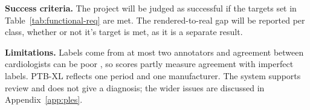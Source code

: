 \textbf{Success criteria.} The project will be judged as successful if the targets set in Table~\ref{tab:functional-req} are met. The rendered-to-real gap will be reported per class, whether or not it's target is met, as it is a separate result.

\textbf{Limitations.} Labels come from at most two annotators \cite{wagner_ptbxl_2020} and
agreement between cardiologists can be poor \cite{dhutia_interrater_2017}, so scores partly
measure agreement with imperfect labels. PTB-XL reflects one period and one manufacturer.
The system supports review and does not give a diagnosis; the wider issues are discussed in
Appendix~\ref{app:ples}.